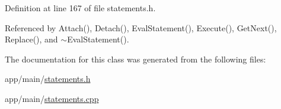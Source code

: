 Definition at line 167 of file statements.\+h.



Referenced by Attach(), Detach(), Eval\+Statement(), Execute(), Get\+Next(), Replace(), and $\sim$\+Eval\+Statement().



The documentation for this class was generated from the following files\+:\begin{DoxyCompactItemize}
\item 
app/main/\hyperlink{statements_8h}{statements.\+h}\item 
app/main/\hyperlink{statements_8cpp}{statements.\+cpp}\end{DoxyCompactItemize}
